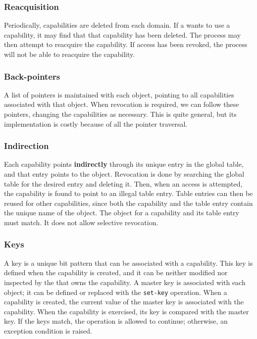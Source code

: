 \subsubsection{Reacquisition}\label{subsubsec:Capability_Revokation_Reacquisition}
Periodically, capabilities are deleted from each domain.
If a  wants to use a capability, it may find that that capability has been deleted.
The process may then attempt to reacquire the capability.
If access has been revoked, the process will not be able to reacquire the capability.

\subsubsection{Back-pointers}\label{subsubsec:Capability_Revokation_Back_Pointers}
A list of pointers is maintained with each object, pointing to all capabilities associated with that object.
When revocation is required, we can follow these pointers, changing the capabilities as necessary.
This is quite general, but its implementation is costly because of all the pointer traversal.

\subsubsection{Indirection}\label{subsubsec:Capability_Revokation_Indirection}
Each capability points \textbf{indirectly} through its unique entry in the global table, and that entry points to the object.
Revocation is done by searching the global table for the desired entry and deleting it.
Then, when an access is attempted, the capability is found to point to an illegal table entry.
Table entries can then be reused for other capabilities, since both the capability and the table entry contain the unique name of the object.
The object for a capability and its table entry must match.
It does not allow selective revocation.

\subsubsection{Keys}\label{subsubsec:Capability_Revokation_Keys}
A key is a unique bit pattern that can be associated with a capability.
This key is defined when the capability is created, and it can be neither modified nor inspected by the  that owns the capability.
A master key is associated with each object; it can be defined or replaced with the \texttt{set-key} operation.
When a capability is created, the current value of the master key is associated with the capability.
When the capability is exercised, its key is compared with the master key.
If the keys match, the operation is allowed to continue; otherwise, an exception condition is raised.


